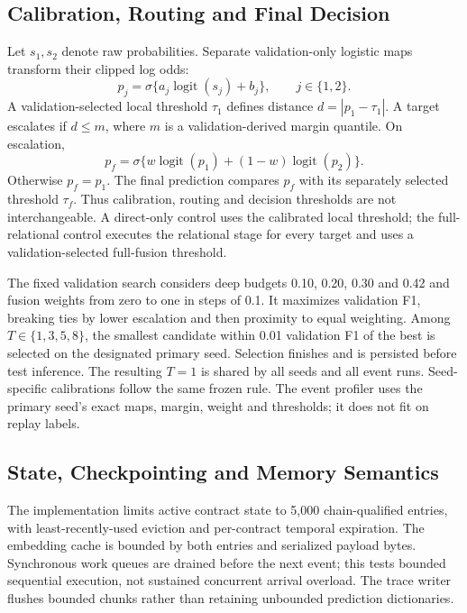 \documentclass[10pt,journal]{IEEEtran}
\begin{document}
\subsection{Calibration, Routing and Final Decision}
Let $s_1,s_2$ denote raw probabilities. Separate validation-only logistic maps transform their clipped log odds:
\begin{equation}
p_j=\sigma\{a_j\operatorname{logit}(s_j)+b_j\},\qquad j\in\{1,2\}.
\end{equation}
A validation-selected local threshold $\tau_1$ defines distance $d=|p_1-\tau_1|$. A target escalates if $d\leq m$, where $m$ is a validation-derived margin quantile. On escalation,
\begin{equation}
p_f=\sigma\{w\operatorname{logit}(p_1)+(1-w)\operatorname{logit}(p_2)\}.
\end{equation}
Otherwise $p_f=p_1$. The final prediction compares $p_f$ with its separately selected threshold $\tau_f$. Thus calibration, routing and decision thresholds are not interchangeable. A direct-only control uses the calibrated local threshold; the full-relational control executes the relational stage for every target and uses a validation-selected full-fusion threshold.

The fixed validation search considers deep budgets 0.10, 0.20, 0.30 and 0.42 and fusion weights from zero to one in steps of 0.1. It maximizes validation F1, breaking ties by lower escalation and then proximity to equal weighting. Among $T\in\{1,3,5,8\}$, the smallest candidate within 0.01 validation F1 of the best is selected on the designated primary seed. Selection finishes and is persisted before test inference. The resulting $T=1$ is shared by all seeds and all event runs. Seed-specific calibrations follow the same frozen rule. The event profiler uses the primary seed's exact maps, margin, weight and thresholds; it does not fit on replay labels.

\subsection{State, Checkpointing and Memory Semantics}
The implementation limits active contract state to 5,000 chain-qualified entries, with least-recently-used eviction and per-contract temporal expiration. The embedding cache is bounded by both entries and serialized payload bytes. Synchronous work queues are drained before the next event; this tests bounded sequential execution, not sustained concurrent arrival overload. The trace writer flushes bounded chunks rather than retaining unbounded prediction dictionaries.
\end{document}

